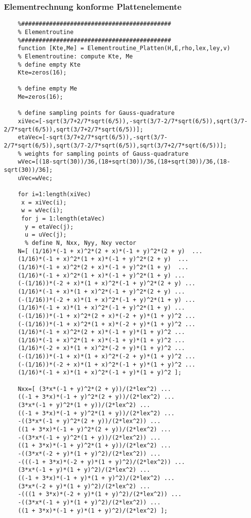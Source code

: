 	\subsubsection*{Elementrechnung konforme Plattenelemente}
	\begin{lstlisting}
	%###########################################
	% Elementroutine
	%###########################################
	function [Kte,Me] = Elementroutine_Platten(H,E,rho,lex,ley,v)
	% Elementroutine: compute Kte, Me
	% define empty Kte
	Kte=zeros(16);
	
	% define empty Me
	Me=zeros(16);
	
	% define sampling points for Gauss-quadrature
	xiVec=[-sqrt(3/7+2/7*sqrt(6/5)),-sqrt(3/7-2/7*sqrt(6/5)),sqrt(3/7-2/7*sqrt(6/5)),sqrt(3/7+2/7*sqrt(6/5))];
	etaVec=[-sqrt(3/7+2/7*sqrt(6/5)),-sqrt(3/7-2/7*sqrt(6/5)),sqrt(3/7-2/7*sqrt(6/5)),sqrt(3/7+2/7*sqrt(6/5))];
	% weights for sampling points of Gauss-quadrature
	wVec=[(18-sqrt(30))/36,(18+sqrt(30))/36,(18+sqrt(30))/36,(18-sqrt(30))/36];
	uVec=wVec;
	
	for i=1:length(xiVec)
	 x = xiVec(i);
	 w = wVec(i);
	 for j = 1:length(etaVec)
	  y = etaVec(j);
	  u = uVec(j);        
	  % define N, Nxx, Nyy, Nxy vector
	N=[ (1/16)*(-1 + x)^2*(2 + x)*(-1 + y)^2*(2 + y)  ...
	(1/16)*(-1 + x)^2*(1 + x)*(-1 + y)^2*(2 + y)  ...
	(1/16)*(-1 + x)^2*(2 + x)*(-1 + y)^2*(1 + y)  ...
	(1/16)*(-1 + x)^2*(1 + x)*(-1 + y)^2*(1 + y) ...
	(-(1/16))*(-2 + x)*(1 + x)^2*(-1 + y)^2*(2 + y) ...
	(1/16)*(-1 + x)*(1 + x)^2*(-1 + y)^2*(2 + y) ...
	(-(1/16))*(-2 + x)*(1 + x)^2*(-1 + y)^2*(1 + y) ...
	(1/16)*(-1 + x)*(1 + x)^2*(-1 + y)^2*(1 + y) ...
	(-(1/16))*(-1 + x)^2*(2 + x)*(-2 + y)*(1 + y)^2 ...
	(-(1/16))*(-1 + x)^2*(1 + x)*(-2 + y)*(1 + y)^2 ...
	(1/16)*(-1 + x)^2*(2 + x)*(-1 + y)*(1 + y)^2 ...
	(1/16)*(-1 + x)^2*(1 + x)*(-1 + y)*(1 + y)^2 ...
	(1/16)*(-2 + x)*(1 + x)^2*(-2 + y)*(1 + y)^2 ...
	(-(1/16))*(-1 + x)*(1 + x)^2*(-2 + y)*(1 + y)^2 ...
	(-(1/16))*(-2 + x)*(1 + x)^2*(-1 + y)*(1 + y)^2 ...
	(1/16)*(-1 + x)*(1 + x)^2*(-1 + y)*(1 + y)^2 ];
	
	Nxx=[ (3*x*(-1 + y)^2*(2 + y))/(2*lex^2) ...
	((-1 + 3*x)*(-1 + y)^2*(2 + y))/(2*lex^2) ...
	(3*x*(-1 + y)^2*(1 + y))/(2*lex^2) ...
	((-1 + 3*x)*(-1 + y)^2*(1 + y))/(2*lex^2) ...
	-((3*x*(-1 + y)^2*(2 + y))/(2*lex^2)) ...
	((1 + 3*x)*(-1 + y)^2*(2 + y))/(2*lex^2) ...
	-((3*x*(-1 + y)^2*(1 + y))/(2*lex^2)) ...
	((1 + 3*x)*(-1 + y)^2*(1 + y))/(2*lex^2) ...
	-((3*x*(-2 + y)*(1 + y)^2)/(2*lex^2)) ...
	-(((-1 + 3*x)*(-2 + y)*(1 + y)^2)/(2*lex^2)) ...
	(3*x*(-1 + y)*(1 + y)^2)/(2*lex^2) ...
	((-1 + 3*x)*(-1 + y)*(1 + y)^2)/(2*lex^2) ...
	(3*x*(-2 + y)*(1 + y)^2)/(2*lex^2) ...
	-(((1 + 3*x)*(-2 + y)*(1 + y)^2)/(2*lex^2)) ...
	-((3*x*(-1 + y)*(1 + y)^2)/(2*lex^2)) ...
	((1 + 3*x)*(-1 + y)*(1 + y)^2)/(2*lex^2) ];
	

\end{lstlisting}
